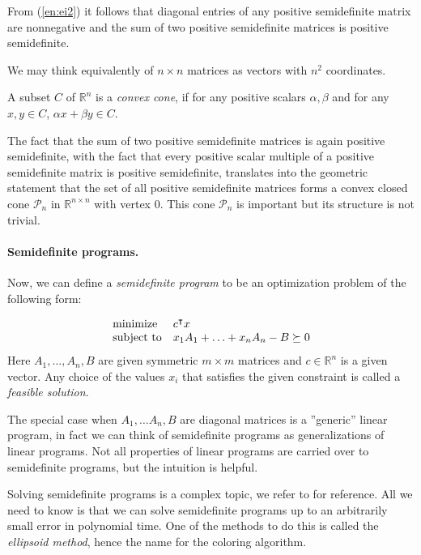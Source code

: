 From (\ref{en:ei2}) it follows that diagonal entries of any positive semidefinite matrix are nonnegative and the sum of two positive semidefinite matrices is positive semidefinite.

We may think equivalently of $n \times n$ matrices as vectors with $n^2$ coordinates.
\begin{defn}
  A subset $C$ of $\mathbb{R}^n$ is a \emph{convex cone}, if for any positive scalars $\alpha, \beta$ and for any $x, y \in C$, $\alpha x + \beta y \in C$.
\end{defn}

The fact that the sum of two positive semidefinite matrices is again positive semidefinite, with the fact that every positive scalar multiple of a positive semidefinite matrix is positive semidefinite, translates into the geometric statement that the set of all positive semidefinite matrices forms a convex closed cone $\mathcal{P}_n$ in $\mathbb{R}^{n \times n}$ with vertex 0. This cone $\mathcal{P}_n$ is important but its structure is not trivial.

\paragraph{Semidefinite programs.}

Now, we can define a \emph{semidefinite program} to be an optimization problem of the following form:

\begin{equation*}
  \begin{array}{ll@{}ll}
    \text{minimize}   & c^\intercal x                          & \\
    \text{subject to} & x_1A_1 + \ldots + x_nA_n - B \succeq 0   \\
  \end{array}
\end{equation*}
Here $A_1, \ldots, A_n, B$ are given symmetric $m \times m$ matrices and $c \in \mathbb{R}^n$ is a given vector. Any choice of the values $x_i$ that satisfies the given constraint is called a \emph{feasible solution}.

The special case when $A_1, \ldots A_n, B$ are diagonal matrices is a ''generic'' linear program, in fact we can think of semidefinite programs as generalizations of linear programs. Not all properties of linear programs are carried over to semidefinite programs, but the intuition is helpful.

Solving semidefinite programs is a complex topic, we refer to \cite{grotschel1993} for reference. All we need to know is that we can solve semidefinite programs up to an arbitrarily small error in polynomial time. One of the methods to do this is called the \emph{ellipsoid method}, hence the name for the coloring algorithm.

